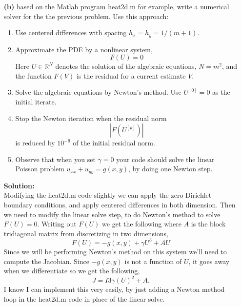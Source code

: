 \documentclass[12pt]{article}
\makeatletter
\theoremstyle{homework}
\newenvironment{exercise}[1]
{\def\@currentlabel{#1}\exercisecore}
{\endexercisecore}
\newcommand{\localhead}[1]{\par\smallskip\noindent\textbf{#1}\nobreak\\}%
\newcommand\solution{\localhead{Solution:}}
\newcommand{\Reals}{\ensuremath{\mathbb R}}
\let\RR\Reals
\makeatother
\begin{document}
\begin{exercise}{Problem P38}
\begin{enumerate}
    \item[\textbf{(b)}] based on the Matlab program heat2d.m for example, write a numerical solver for the the previous problem. Use this approach:
    \begin{enumerate}
      \item Use centered differences with spacing $h_x = h_y = 1/(m+1).$
      \item Approximate the PDE by a nonlinear system, $$F(U) = 0$$ Here $U \in \RR^N$ denotes the solution of the algebraic equations, $N = m^2$, and the function $F(V)$ is the residual for a current estimate $V$.
      \item Solve the algebraic equations by Newton's method. Use $U^{[0]} = 0$ as the initial iterate. 
      \item Stop the Newton iteration when the residual norm $$|F(U^{[k]})|$$ is reduced by $10^{-9}$ of the initial residual norm. 
      \item Observe that when you set $\gamma = 0$ your code should solve the linear Poisson problem $u_{xx} + u_{yy} = g(x, y)$, by doing one Newton step. 
    \end{enumerate}
    \solution Modifying the heat2d.m code slightly we can apply the zero Dirichlet boundary conditions, and apply centered differences in both dimension. Then we need to modify the linear solve step, to do Newton's method to solve $F(U) = 0$. Writing out $F(U)$ we get the following where $A$ is the block tridiagonal matrix from discretizing in two dimensions, 
    \begin{equation*}
      F(U)= -g(x, y) + \gamma U^3 +AU
    \end{equation*}
    Since we will be performing Newton's method on this system we'll need to compute the Jacobian. Since $-g(x, y)$ is not a function of $U$, it goes away when we differentiate so we get the following,
    \begin{equation*}
      J = I3\gamma(U)^2 + A.
    \end{equation*}
    I know I can implement this very easily, by just adding a Newton method loop in the heat2d.m code in place of the linear solve. 














  \end{enumerate}
  
\end{exercise}
\end{document}
